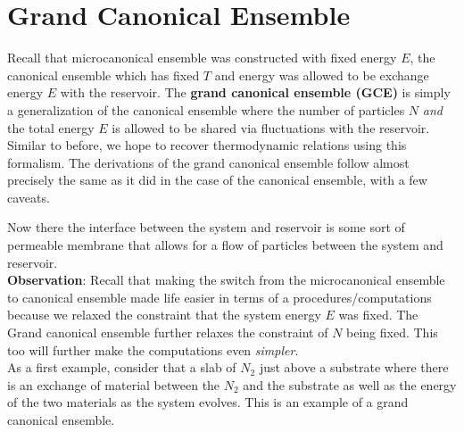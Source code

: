 \documentclass{article}
\begin{document}
{\section{Grand Canonical Ensemble}

Recall that microcanonical ensemble was constructed with fixed energy $E$, the canonical ensemble which has fixed $T$ and energy was allowed to be exchange energy $E$ with the reservoir. The \textbf{grand canonical ensemble (GCE)} is simply a generalization of the canonical ensemble where the number of particles $N$ \textit{and} the total energy $E$ is allowed to be shared via fluctuations with the reservoir. Similar to before, we hope to recover thermodynamic relations using this formalism. The derivations of the grand canonical ensemble follow almost precisely the same as it did in the case of the canonical ensemble, with a few caveats. \\

\begin{center}
\end{center}

Now there the interface between the system and reservoir is some sort of permeable membrane that allows for a flow of particles between the system and reservoir. \\

\textbf{Observation}: Recall that making the switch from the microcanonical ensemble to canonical ensemble made life easier in terms of a procedures/computations because we relaxed the constraint that the system energy $E$ was fixed. The Grand canonical ensemble further relaxes the constraint of $N$ being fixed. This too will further make the computations even \textit{simpler}. \\

As a first example, consider that a slab of $N_2$ just above a substrate where there is an exchange of material between the $N_2$ and the substrate as well as the energy of the two materials as the system evolves. This is an example of a grand canonical ensemble. \\

}
\end{document}
